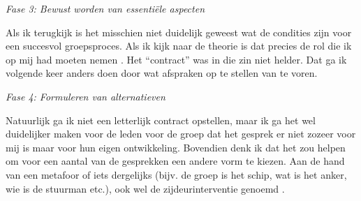\noindent \emph{Fase 3: Bewust worden van essentiële aspecten}

Als ik terugkijk is het misschien niet duidelijk geweest wat de condities zijn voor een succesvol groepsproces. Als ik kijk naar de theorie is dat precies de rol die ik op mij had moeten nemen \cite{baert2009interventies}. Het ``contract'' was in die zin niet helder. Dat ga ik volgende keer anders doen door wat afspraken op te stellen van te voren.

\noindent \emph{Fase 4: Formuleren van alternatieven}

Natuurlijk ga ik niet een letterlijk contract opstellen, maar ik ga het wel duidelijker maken voor de leden voor de groep dat het gesprek er niet zozeer voor mij is maar voor hun eigen ontwikkeling. Bovendien denk ik dat het zou helpen om voor een aantal van de gesprekken een andere vorm te kiezen. Aan de hand van een metafoor of iets dergelijks (bijv. de groep is het schip, wat is het anker, wie is de stuurman etc.), ook wel de zijdeurinterventie genoemd \cite{remmerswaal2015zijdeurinterventies}.
